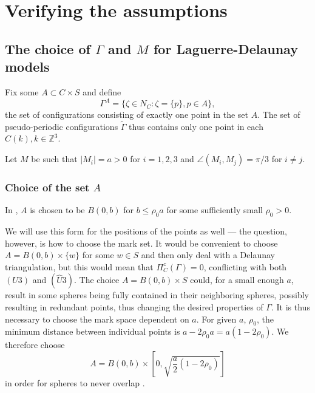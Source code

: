 \section{Verifying the assumptions}

\subsection{The choice of $\Gamma$ and $M$ for Laguerre-Delaunay models}
Fix some $A \subset C\times S$ and define
$$\Gamma^A = \{\zeta \in N_C: \zeta = \{p\}, p \in A\},$$
the set of configurations consisting of exactly one point in the set $A$. The set of pseudo-periodic configurations $\tilde\Gamma$ thus contains only one point in each $C(k), k\in\mathbb Z^3$.

Let $M$ be such that $|M_i| = a > 0$ for $i=1,2,3$ and $\angle(M_i,M_j) = \pi / 3$ for $i\neq j$.

\subsubsection{Choice of the set $A$}
In \cite{DDG12}, $A$ is chosen to be $B(0,b)$ for $b\leq \rho_0 a$ for some  sufficiently small $\rho_0 >0$. 

We will use this form for the positions of the points as well --- the question, however, is how to choose the mark set. It would be convenient to choose $A=B(0,b)\times\{w\}$ for some $w\in S$ and then only deal with a Delaunay triangulation, but this  would mean that $\Pi^z_C(\Gamma) = 0$, conflicting with both $(U3)$ and $(\hat U3)$. The choice $A=B(0,b)\times S$ could, for a small enough $a$, result in some spheres being fully contained in their neighboring spheres, possibly resulting in redundant points, thus changing the desired properties of $\Gamma$. It is thus necessary to choose the mark space dependent on $a$. For given $a$, $\rho_0$, the minimum distance between individual points is $a-2\rho_0 a = a(1-2\rho_0)$. We therefore choose 
$$A = B(0,b)\times \left[0, \sqrt{\frac a2(1-2\rho_0)}\right]$$ 
in order for spheres to never overlap . 




